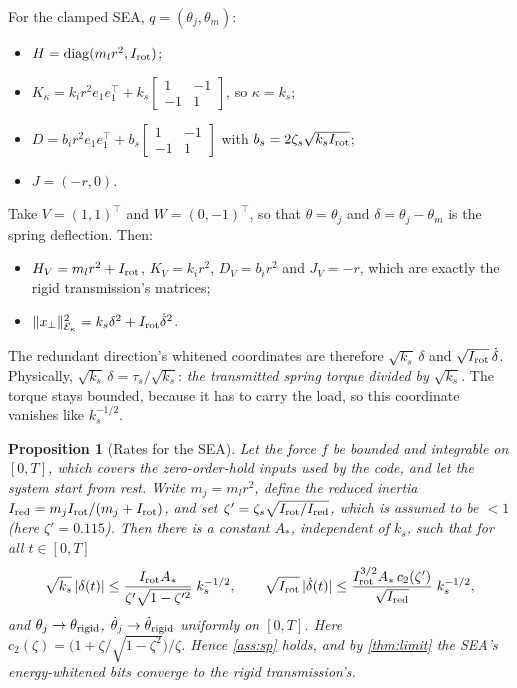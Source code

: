 \documentclass[11pt]{article}
\newtheorem{proposition}[theorem]{Proposition}
\theoremstyle{definition}
\theoremstyle{remark}
\newcommand{\diag}{\operatorname{diag}}
\newcommand{\Em}{\mathcal{E}}         %
\begin{document}
For the clamped SEA, $q=(\theta_j,\theta_m)$:
\begin{itemize}[nosep]
  \item $H=\diag(m_lr^2,I_{\rm rot})$;
  \item $K_\kappa=k_ir^2e_1e_1^\top+k_s\left[\begin{smallmatrix}1&-1\\-1&1\end{smallmatrix}\right]$,
        so $\kappa=k_s$;
  \item $D=b_ir^2e_1e_1^\top+b_s\left[\begin{smallmatrix}1&-1\\-1&1\end{smallmatrix}\right]$
        with $b_s=2\zeta_s\sqrt{k_sI_{\rm rot}}$;
  \item $J=(-r,0)$.
\end{itemize}
Take $V=(1,1)^\top$ and $W=(0,-1)^\top$, so that $\theta=\theta_j$ and
$\delta=\theta_j-\theta_m$ is the spring deflection. Then:
\begin{itemize}[nosep]
  \item $H_V=m_lr^2+I_{\rm rot}$, $K_V=k_ir^2$, $D_V=b_ir^2$ and $J_V=-r$, which are
        exactly the rigid transmission's matrices;
  \item $\|x_\perp\|^2_{\Em_\kappa}=k_s\delta^2+I_{\rm rot}\dot\delta^2$.
\end{itemize}
The redundant direction's whitened coordinates are therefore $\sqrt{k_s}\,\delta$ and
$\sqrt{I_{\rm rot}}\,\dot\delta$. Physically, $\sqrt{k_s}\,\delta=\tau_s/\sqrt{k_s}$:
\emph{the transmitted spring torque divided by $\sqrt{k_s}$}. The torque stays bounded,
because it has to carry the load, so this coordinate vanishes like $k_s^{-1/2}$.

\begin{proposition}[Rates for the SEA]\label{prop:sea}
Let the force $f$ be bounded and integrable on $[0,T]$, which covers the zero-order-hold
inputs used by the code, and let the system start from rest. Write $m_j=m_lr^2$, define
the reduced inertia $I_{\rm red}=m_jI_{\rm rot}/(m_j+I_{\rm rot})$, and set
$\zeta'=\zeta_s\sqrt{I_{\rm rot}/I_{\rm red}}$, which is assumed to be $<1$ (here
$\zeta'=0.115$). Then there is a constant $A_*$, independent of $k_s$, such that for all
$t\in[0,T]$
\[
  \sqrt{k_s}\,|\delta(t)|\le\frac{I_{\rm rot}A_*}{\zeta'\sqrt{1-\zeta'^2}}\;k_s^{-1/2},
  \qquad
  \sqrt{I_{\rm rot}}\,|\dot\delta(t)|\le
  \frac{I_{\rm rot}^{3/2}A_*\,c_2(\zeta')}{\sqrt{I_{\rm red}}}\;k_s^{-1/2},
\]
and $\theta_j\to\theta_{\rm rigid}$, $\dot\theta_j\to\dot\theta_{\rm rigid}$ uniformly on
$[0,T]$. Here $c_2(\zeta)=\big(1+\zeta/\sqrt{1-\zeta^2}\big)/\zeta$. Hence \cref{ass:sp}
holds, and by \cref{thm:limit} the SEA's energy-whitened bits converge to the rigid
transmission's.
\end{proposition}
\end{document}
